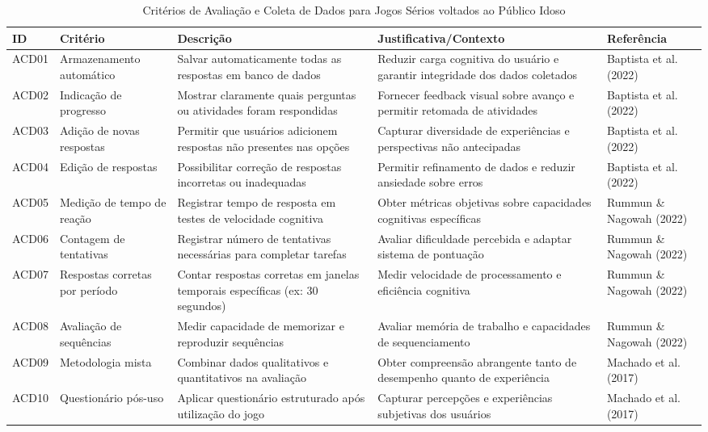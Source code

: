 \begin{table}[H]
\begin{table}[H]
\centering
\caption{Critérios de Avaliação e Coleta de Dados para Jogos Sérios voltados ao Público Idoso}
\label{tab:avaliacao_coleta_dados}
\begin{tabular}{p{0.5cm}p{3cm}p{4cm}p{4cm}p{2.5cm}}
\hline
\textbf{ID} & \textbf{Critério} & \textbf{Descrição} & \textbf{Justificativa/Contexto} & \textbf{Referência} \\ \hline
ACD01 & Armazenamento automático & Salvar automaticamente todas as respostas em banco de dados & Reduzir carga cognitiva do usuário e garantir integridade dos dados coletados & Baptista et al. (2022) \\
ACD02 & Indicação de progresso & Mostrar claramente quais perguntas ou atividades foram respondidas & Fornecer feedback visual sobre avanço e permitir retomada de atividades & Baptista et al. (2022) \\
ACD03 & Adição de novas respostas & Permitir que usuários adicionem respostas não presentes nas opções & Capturar diversidade de experiências e perspectivas não antecipadas & Baptista et al. (2022) \\
ACD04 & Edição de respostas & Possibilitar correção de respostas incorretas ou inadequadas & Permitir refinamento de dados e reduzir ansiedade sobre erros & Baptista et al. (2022) \\
ACD05 & Medição de tempo de reação & Registrar tempo de resposta em testes de velocidade cognitiva & Obter métricas objetivas sobre capacidades cognitivas específicas & Rummun \& Nagowah (2022) \\
ACD06 & Contagem de tentativas & Registrar número de tentativas necessárias para completar tarefas & Avaliar dificuldade percebida e adaptar sistema de pontuação & Rummun \& Nagowah (2022) \\
ACD07 & Respostas corretas por período & Contar respostas corretas em janelas temporais específicas (ex: 30 segundos) & Medir velocidade de processamento e eficiência cognitiva & Rummun \& Nagowah (2022) \\
ACD08 & Avaliação de sequências & Medir capacidade de memorizar e reproduzir sequências & Avaliar memória de trabalho e capacidades de sequenciamento & Rummun \& Nagowah (2022) \\
ACD09 & Metodologia mista & Combinar dados qualitativos e quantitativos na avaliação & Obter compreensão abrangente tanto de desempenho quanto de experiência & Machado et al. (2017) \\
ACD10 & Questionário pós-uso & Aplicar questionário estruturado após utilização do jogo & Capturar percepções e experiências subjetivas dos usuários & Machado et al. (2017) \\

\end{tabular}
\end{table}
\end{table}
